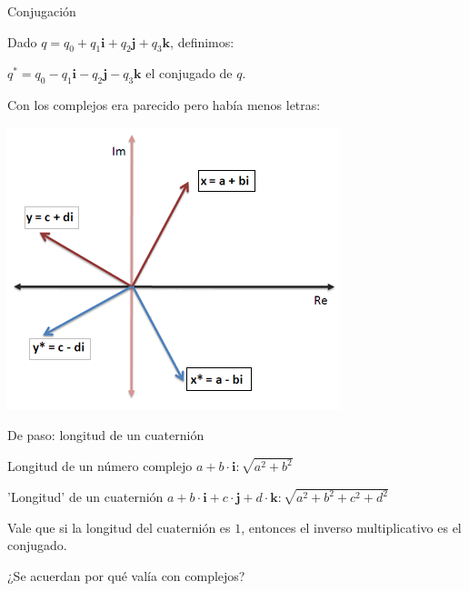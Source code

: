 \documentclass[10pt]{beamer}
\def\R{\mathbb{R}}
\def\ii{\textbf{i}}
\def\jj{\textbf{j}}
\def\kk{\textbf{k}}
\begin{document}
\begin{frame}{Conjugación}

Dado $q=q_0 + q_1 \textbf{i}+ q_2 \textbf{j}+ q_3 \textbf{k}$, definimos:

$q^* = q_0 -  q_1 \textbf{i} -  q_2 \textbf{j}-  q_3\textbf{k}$ el conjugado de $q$. \bigskip


Con los complejos era parecido pero había menos letras:

\includegraphics[scale=0.5]{conjugado.png}

\end{frame}


\begin{frame}{De paso: longitud de un cuaternión}
    
    Longitud de un número complejo $a+b\cdot \ii: \sqrt{a^2+b^2}$ \bigskip
    
    'Longitud' de un cuaternión $a+b\cdot \ii + c\cdot \jj + d\cdot \kk: \sqrt{a^2+b^2+c^2+d^2}$ \pause
    
    Vale que si la longitud del cuaternión es $1$, entonces el inverso multiplicativo es el conjugado.
    
    ¿Se acuerdan por qué valía con complejos?
\end{frame}
\end{document}
